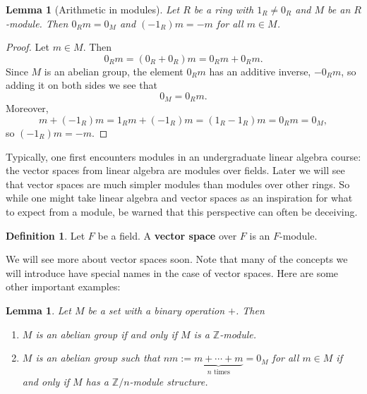 \documentclass[12pt]{report}
\newtheorem{lemma}[theorem]{Lemma}
\numberwithin{equation}{section}
\numberwithin{theorem}{chapter}
\theoremstyle{definition}
\newtheorem{definition}[theorem]{Definition}
\newtheorem*{basic properties}{Basic Properties}
\newtheorem*{Important Remark}{Important Remark}
\newcommand{\df}[1]{{\bf #1}\index{#1}}
\begin{document}
\begin{lemma}[Arithmetic in modules]\label{arithmetic in modules}
Let $R$ be a ring with $1_R \neq 0_R$ and $M$ be an $R$-module. Then $0_Rm = 0_M$ and $(-1_R)m = -m$ for all $m \in M$.
\end{lemma}


\begin{proof}
	Let $m \in M$. Then
	$$0_R m = (0_R + 0_R) m = 0_Rm + 0_Rm.$$
	Since $M$ is an abelian group, the element $0_Rm$ has an additive inverse, $-0_Rm$, so adding it on both sides we see that
	$$0_M = 0_Rm.$$
	Moreover,
	$$m + (-1_R)m = 1_R m + (-1_R)m = (1_R - 1_R)m = 0_R m = 0_M,$$
	so $(-1_R)m = -m$.
\end{proof}



Typically, one first encounters modules in an undergraduate linear algebra course: the vector spaces from linear algebra are modules over fields. Later we will see that vector spaces are much simpler modules than modules over other rings. So while one might take linear algebra and vector spaces as an inspiration for what to expect from a module, be warned that this perspective can often be deceiving.

\begin{definition}
	Let $F$ be a field. A \df{vector space} over $F$ is an $F$-module.
\end{definition}

We will see more about vector spaces soon. Note that many of the concepts we will introduce have special names in the case of vector spaces. Here are some other important examples:



\begin{lemma}\label{Zmods are abelian groups}
 Let $M$ be a set with a binary operation $+$. Then 
 \begin{enumerate}[label=(\arabic*)]
 \item $M$ is an abelian group if and only if $M$ is a $\mathbb{Z}$-module.
 \item $M$ is an abelian group such that $nm:=\underbrace{ m + \cdots + m}_{n \textrm{ times}}=0_M$ for all $m\in M$ if and only if $M$ has a $\mathbb{Z}/n$-module structure.
 \end{enumerate}
\end{lemma}
\end{document}
